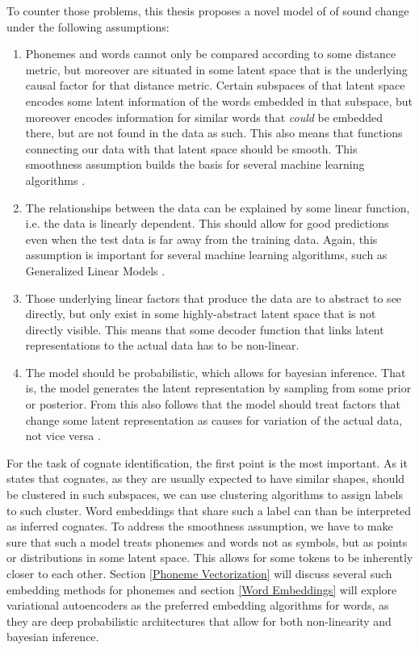 \documentclass[6pt]{article}
\begin{document}
To counter those problems, this thesis proposes a novel model of of sound change under the following assumptions:
\begin{enumerate}
\item Phonemes and words cannot only be compared according to some distance metric, but moreover are situated in some latent space that is the underlying causal factor for that distance metric. Certain subspaces of that latent space encodes some latent information of the words embedded in that subspace, but moreover encodes information for similar words that \textit{could} be embedded there, but are not found in the data as such. This also means that functions connecting our data with that latent space should be smooth. 
This smoothness assumption builds the basis for several machine learning algorithms \citep[p. 557]{Goodfellow-et-al-2016-Book}. 
\item The relationships between the data can be explained by some linear function, i.e. the data is linearly dependent. This should allow for good predictions even when the test data is far away from the training data. Again, this assumption is important for several machine learning algorithms, such as Generalized Linear Models \citep[p. 557]{Goodfellow-et-al-2016-Book}.
\item Those underlying linear factors that produce the data are to abstract to see directly, but only exist in some highly-abstract latent space that is not directly visible. This means that some decoder function that links latent representations to the actual data has to be non-linear.
\item The model should be probabilistic, which allows for bayesian inference.  That is, the model generates the latent representation by sampling from some prior or posterior. From this also follows that the model should treat factors that change some latent representation as causes for variation of the actual data, not vice versa \citep[p. 557]{Goodfellow-et-al-2016-Book}.

\end{enumerate}
For the task of cognate identification, the first point is the most important. As it states that cognates, as they are usually expected to have similar shapes, should be clustered in such subspaces, we can use clustering algorithms to assign labels to such cluster. Word embeddings that share such a label can than be interpreted as inferred cognates.
To address the smoothness assumption, we have to make sure that such a model treats phonemes and words not as symbols, but as points or distributions in some latent space. This allows for some tokens to be inherently closer to each other. Section \ref{Phoneme Vectorization} will discuss several such embedding methods for phonemes and section \ref{Word Embeddings} will explore variational autoencoders \citep{kingma2013auto} as the preferred embedding algorithms for words, as they are deep probabilistic architectures that allow for both non-linearity and bayesian inference.
\end{document}
